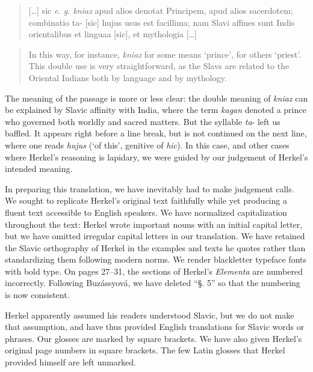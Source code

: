 \begin{quote}
    […] sic \textit{e. g. kniaz} apud alios denotat Principem, apud alios sacerdotem; combinatio ta- [sic] hujus usus est facillima; nam Slavi affines sunt Indis orientalibus et linguaa [sic], et mythologia […]
\end{quote}

\begin{quote}
In this way, for instance, \textit{kniaz} for some means ‘prince’, for others ‘priest’. This double use is very straightforward, as the Slavs are related to the Oriental Indians both by language and by mythology.
\end{quote}

The meaning of the passage is more or less clear: the double meaning of \textit{kniaz} can be explained by Slavic affinity with India, where the term \textit{kagan} denoted a prince who governed both worldly and sacred matters. But the syllable \textit{ta}- left us baffled. It appears right before a line break, but is not continued on the next line, where one reads \textit{hujus} (‘of this’, genitive of \textit{hic}). In this case, and other cases where Herkel’s reasoning is lapidary, we were guided by our judgement of Herkel’s intended meaning.

In preparing this translation, we have inevitably had to make judgement calls. We sought to replicate Herkel’s original text faithfully while yet producing a fluent text accessible to English speakers. We have normalized capitalization throughout the text: Herkel wrote important nouns with an initial capital letter, but we have omitted irregular capital letters in our translation. We have retained the Slavic orthography of Herkel in the examples and texts he quotes rather than standardizing them following modern norms. We render blackletter typeface fonts with bold type. On pages 27--31, the sections of Herkel’s \textit{Elementa} are numbered incorrectly. Following Buzássyová, we have deleted “§. 5” so that the numbering is now consistent.

Herkel apparently assumed his readers understood Slavic, but we do not make that assumption, and have thus provided English translations for Slavic words or phrases. Our glosses are marked by square brackets. We have also given Herkel’s original page numbers in square brackets. The few Latin glosses that Herkel provided himself are left unmarked.

